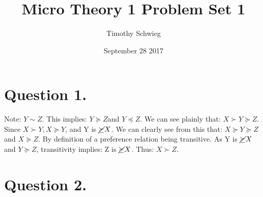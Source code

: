 \documentclass[10pt, letterpaper]{paper}
\title{ Micro Theory 1 Problem Set 1}
\author{ Timothy Schwieg }
\date{ September 28 2017 }
\begin{document}
\maketitle

\section*{ Question 1. }
Note: $Y \sim Z$. This implies: $Y \succeq Z$and $Y \preceq Z$. We can see plainly that: $X \succ Y \succeq Z$.
Since $X \succ Y, X \succeq Y$, and Y is $\cancel{\succeq} X$. We can clearly see from this that: $X \succeq Y \succeq Z$ and $X \succeq Z$. By definition of a preference relation being transitive.
As Y is $\cancel{\succeq} X$ and $Y \succeq Z$, transitivity implies: Z is $\cancel{ \succeq} X$. Thus: $X \succ Z$.

\section*{Question 2.}
\end{document}
